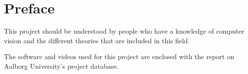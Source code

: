 \section*{Preface}
This project should be understood by people who have a knowledge of computer vision and the different theories that are included in this field.

The software and videos used for this project are enclosed with the report on Aalborg University's project database.